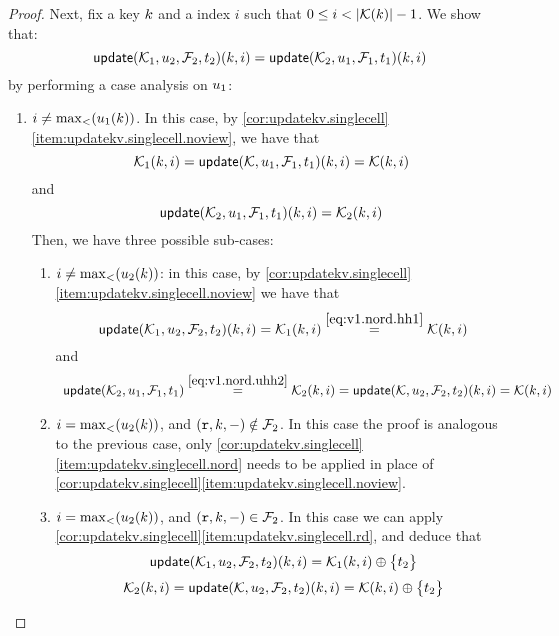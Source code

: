 \begin{proof}
Next, fix a key $k$ and a index $i$ such that $0 \leq i < \lvert  \mathcal{K}(k)  \rvert - 1$. 
We show that:
\[ 
    \updateKV(\hh_1,\vi_2,\fp_2,\txid_2)(\ke, i) = \updateKV(\hh_2, \vi_1, \fp_1, \txid_1)(\ke, i)
\]
by performing a case analysis on $u_1$: 
\begin{enumerate}
    \item $i \neq \max_{<}(u_1(k))$. 
In this case, by \cref{cor:updatekv.singlecell}\cref{item:updatekv.singlecell.noview}, 
we have that 
\begin{equation}
\hh_1(\ke, i) = \updateKV(\mkvs, \vi_1, \fp_1, \txid_1)(\ke, i) = \mkvs(\ke, i)
\label{eq:v1.nord.hh1}
\end{equation}
and 
\begin{equation}
\updateKV(\hh_2, \vi_1, \fp_1, \txid_1)(\ke, i) = \hh_2(\ke, i)
\label{eq:v1.nord.uhh2}
\end{equation}
Then, we have three possible sub-cases: 
\begin{enumerate}
    \item $i \neq \max_{<}(u_2(k))$: in this case, by \cref{cor:updatekv.singlecell}\cref{item:updatekv.singlecell.noview} we have that 
\[\updateKV(\hh_1, \vi_2, \fp_2, \txid_2)(\ke, i) = 
\hh_1(\ke, i) \stackrel{\cref{eq:v1.nord.hh1}}{=} \mkvs(\ke, i)
\]
and
\[
\begin{array}{l}
\updateKV(\hh_2, \vi_1, \fp_1, \txid_1) \stackrel{\cref{eq:v1.nord.uhh2}}{=} \hh_2(\ke,i) = 
\updateKV(\mkvs, \vi_2, \fp_2, \txid_2)(\ke, i) = \mkvs(\ke, i)
\end{array}
\]
\item $i = \max_{<}(u_2(k))$, and $(\textnormal{\texttt r}, k, -) \notin \mathcal{F}_2$. In this case the proof is analogous to the previous case, 
only \cref{cor:updatekv.singlecell}\cref{item:updatekv.singlecell.nord} needs to be applied in place 
of \cref{cor:updatekv.singlecell}\cref{item:updatekv.singlecell.noview}.
\item $i = \max_{<}(u_2(k))$, and $(\textnormal{\texttt r}, k, -) \in \mathcal{F}_2$. In this case we can apply \cref{cor:updatekv.singlecell}\cref{item:updatekv.singlecell.rd}, 
and deduce that 
\begin{equation}
\updateKV(\hh_1, \vi_2, \fp_2, \txid_2)(\ke, i) = \hh_1(\ke, i) \oplus \Set{\txid_2}
\label{eq:v1.nord.v2.rd.uhh1}
\end{equation}
\begin{equation}
\hh_2(\ke, i) = \updateKV(\mkvs, \vi_2, \fp_2, \txid_2)(\ke, i) = \mkvs(\ke,i) \oplus \Set{\txid_2}
\label{eq:v1.nord.v2.rd.hh2}
\end{equation}

\end{enumerate}
\end{enumerate}
\end{proof}
